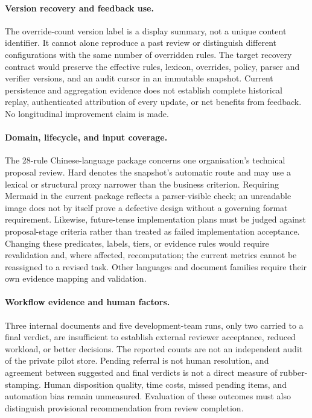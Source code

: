 \documentclass[computers,article,submit,moreauthors]{Definitions/mdpi}
\begin{document}
\paragraph{Version recovery and feedback use.}
The override-count version label is a display summary, not a unique content identifier. It cannot alone reproduce a past review or distinguish different configurations with the same number of overridden rules. The target recovery contract would preserve the effective rules, lexicon, overrides, policy, parser and verifier versions, and an audit cursor in an immutable snapshot. Current persistence and aggregation evidence does not establish complete historical replay, authenticated attribution of every update, or net benefits from feedback. No longitudinal improvement claim is made.

\paragraph{Domain, lifecycle, and input coverage.}
The 28-rule Chinese-language package concerns one organisation's technical proposal review. Hard denotes the snapshot's automatic route and may use a lexical or structural proxy narrower than the business criterion. Requiring Mermaid in the current package reflects a parser-visible check; an unreadable image does not by itself prove a defective design without a governing format requirement. Likewise, future-tense implementation plans must be judged against proposal-stage criteria rather than treated as failed implementation acceptance. Changing these predicates, labels, tiers, or evidence rules would require revalidation and, where affected, recomputation; the current metrics cannot be reassigned to a revised task. Other languages and document families require their own evidence mapping and validation.

\paragraph{Workflow evidence and human factors.}
Three internal documents and five development-team runs, only two carried to a final verdict, are insufficient to establish external reviewer acceptance, reduced workload, or better decisions. The reported counts are not an independent audit of the private pilot store. Pending referral is not human resolution, and agreement between suggested and final verdicts is not a direct measure of rubber-stamping. Human disposition quality, time costs, missed pending items, and automation bias remain unmeasured. Evaluation of these outcomes must also distinguish provisional recommendation from review completion.
\end{document}
